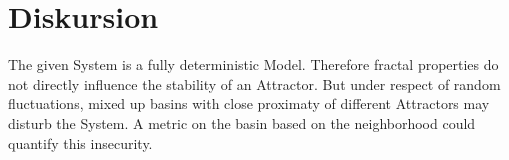 \documentclass[a4paper,12pt, twoside]{article} %
\begin{document}
\section{Diskursion}

The given System is a fully deterministic Model. Therefore fractal properties do not directly influence 
the stability of an Attractor. But under respect of random fluctuations, mixed up basins with close proximaty 
of different Attractors may disturb the System. A metric on the basin based on the neighborhood could quantify this
insecurity. 



\newpage
\thispagestyle{justline}
{\small

}
\end{document}
